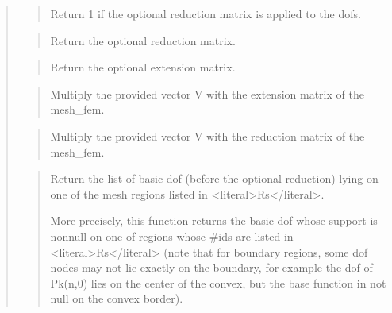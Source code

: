 \documentclass[a4paper,11pt,english]{sphinxmanual}
\begin{document}
\begin{quote}
\begin{quote}
\sphinxAtStartPar
Return 1 if the optional reduction matrix is applied to the dofs.
\end{quote}

\sphinxAtStartPar
{}
\begin{quote}

\sphinxAtStartPar
Return the optional reduction matrix.
\end{quote}

\sphinxAtStartPar
{}
\begin{quote}

\sphinxAtStartPar
Return the optional extension matrix.
\end{quote}

\sphinxAtStartPar
{}
\begin{quote}

\sphinxAtStartPar
Multiply the provided vector V with the extension matrix of the mesh\_fem.
\end{quote}

\sphinxAtStartPar
{}
\begin{quote}

\sphinxAtStartPar
Multiply the provided vector V with the reduction matrix of the mesh\_fem.
\end{quote}

\sphinxAtStartPar
{}
\begin{quote}

\sphinxAtStartPar
Return the list of basic dof (before the optional reduction) lying on one
of the mesh regions listed in \textless{}literal\textgreater{}Rs\textless{}/literal\textgreater{}.

\sphinxAtStartPar
More precisely, this function returns the basic dof whose support is
non\sphinxhyphen{}null on one of regions whose \#ids are listed in \textless{}literal\textgreater{}Rs\textless{}/literal\textgreater{} (note
that for boundary regions, some dof nodes may not lie exactly
on the boundary, for example the dof of Pk(n,0) lies on the center
of the convex, but the base function in not null on the convex
border).
\end{quote}


\end{quote}
\end{document}
